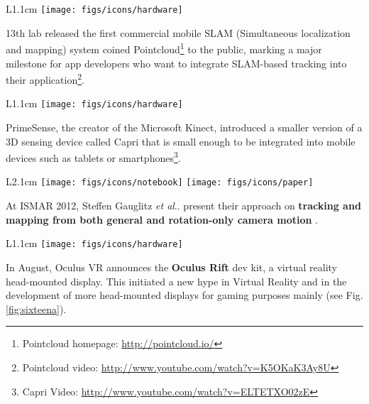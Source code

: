 \documentclass[12pt,a4paper]{article}
\makeatletter
\DeclareRobustCommand\onedot{\futurelet\@let@token\@onedot}
\def\@onedot{\ifx\@let@token.\else.\null\fi\xspace}
\def\etal{\emph{et al}\onedot}
\makeatother
\begin{document}
\vspace{0.1in}

\begin{wrapfigure}{L}{1.1cm}
	\vspace{-15pt}	
	\texttt{[image: figs/icons/hardware]}
	\vspace{-15pt}		
\end{wrapfigure} 
\noindent 13th lab released the first commercial mobile SLAM (Simultaneous localization and mapping) system coined Pointcloud\footnote{Pointcloud homepage: \url{http://pointcloud.io/}} to the public, marking a major milestone for app developers who want to integrate SLAM-based tracking into their application\footnote{Pointcloud video: \url{http://www.youtube.com/watch?v=K5OKaK3Ay8U}}.

\vspace{0.1in}

\begin{wrapfigure}{L}{1.1cm}
	\vspace{-15pt}	
	\texttt{[image: figs/icons/hardware]}
	\vspace{-15pt}		
\end{wrapfigure} 
\noindent PrimeSense, the creator of the Microsoft Kinect, introduced a smaller version of a 3D sensing device called Capri  that is small enough to be integrated into mobile devices such as tablets or smartphones\footnote{Capri Video: \url{http://www.youtube.com/watch?v=ELTETXO02zE}}.

\vspace{0.1in}

\begin{wrapfigure}{L}{2.1cm}
	\vspace{-15pt}	
	\texttt{[image: figs/icons/notebook]}	
	\texttt{[image: figs/icons/paper]}
	\vspace{-25pt}		
\end{wrapfigure}
\noindent At ISMAR 2012, Steffen Gauglitz \etal present their approach on \textbf{tracking and mapping from both general and rotation-only camera motion} \cite{Gauglitz12}. 

\vspace{0.1in}

\begin{wrapfigure}{L}{1.1cm}
	\vspace{-15pt}	
	\texttt{[image: figs/icons/hardware]}
	\vspace{-15pt}		
\end{wrapfigure} 
\noindent In August, Oculus VR announces the \textbf{Oculus Rift} dev kit, a virtual reality head-mounted display. This initiated a new hype in Virtual Reality and in the development of more head-mounted displays for gaming purposes mainly (see Fig.\ref{fig:sixteena}).
\end{document}
